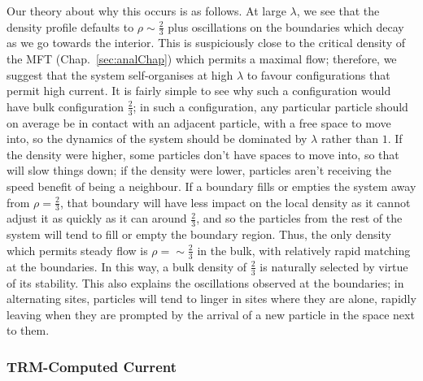  Our theory about why this occurs is as follows.
 At large 
 $\lambda$, we see that the density profile defaults to $\rho\sim\frac{2}{3}$ plus oscillations on the 
 boundaries which decay as we go towards the interior. This is suspiciously close to the critical density
 of the MFT (Chap.~\ref{sec:analChap}) which permits a maximal flow; therefore, we suggest that the system
 self-organises at high $\lambda$ to favour configurations that permit high current. It is fairly simple to
 see why such a configuration would have bulk configuration $\frac{2}{3}$; in such a configuration,
 any particular particle should on average be in contact with an adjacent particle, with a free space to move into, so the dynamics of the system should be dominated by $\lambda$ rather than $1$. If the density were
 higher, some particles don't have spaces to move into, so that will slow things down; if the density were 
 lower, particles aren't receiving the speed benefit of being a neighbour.
 If a boundary fills or empties the system away from $\rho=\frac{2}{3}$, that boundary will have less impact
 on the local density as it cannot adjust it as quickly as it can around $\frac{2}{3}$, and so the particles from the rest of the system will tend to fill or empty the boundary region. Thus, the only density which 
 permits steady flow is $\rho=\sim\frac{2}{3}$ in the bulk, with relatively rapid matching at the boundaries.
 In this way, a bulk density of $\frac{2}{3}$ is naturally selected by virtue of its stability.
 This also explains the oscillations observed at the boundaries; in alternating sites, particles will tend to
 linger in sites where they are alone, rapidly leaving when they are prompted by the arrival of a new particle in 
 the  space next to them.
 
 \subsubsection{TRM-Computed Current}

